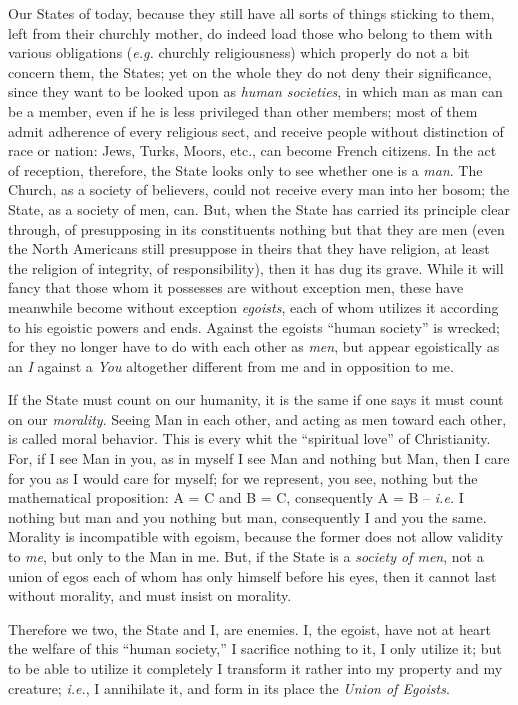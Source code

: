 Our States of today, because they still have all sorts of things sticking to 
them, left from their churchly mother, do indeed load those who belong to them 
with various obligations (\textit{e.g.} churchly religiousness) which 
properly do not a bit concern them, the States; yet on the whole they do not 
deny their significance, since they want to be looked upon as \textit{human 
societies}, in which man as man can be a member, even if he is less privileged 
than other members; most of them admit adherence of every religious sect, and 
receive people without distinction of race or nation: Jews, Turks, Moors, 
etc., can become French citizens. In the act of reception, therefore, the 
State looks only to see whether one is a \textit{man}. The Church, as a 
society of believers, could not receive every man into her bosom; the State, 
as a society of men, can. But, when the State has carried its principle clear 
through, of presupposing in its constituents nothing but that they are men 
(even the North Americans still presuppose in theirs that they have religion, 
at least the religion of integrity, of responsibility), then it has dug its 
grave. While it will fancy that those whom it possesses are without exception 
men, these have meanwhile become without exception \textit{egoists}, each of 
whom utilizes it according to his egoistic powers and ends. Against the 
egoists ``human society'' is wrecked; for they no longer have to do with 
each other as \textit{men}, but appear egoistically as an \textit{I} against a 
\textit{You} altogether different from me and in opposition to me.

If the State must count on our humanity, it is the same if one says it must 
count on our \textit{morality}. Seeing Man in each other, and acting as men 
toward each other, is called moral behavior. This is every whit the 
``spiritual love'' of Christianity. For, if I see Man in you, as in myself I 
see Man and nothing but Man, then I care for you as I would care for myself; 
for we represent, you see, nothing but the mathematical proposition: A = C and 
B = C, consequently A = B -- \textit{i.e.} I nothing but man and you nothing 
but man, consequently I and you the same. Morality is incompatible with 
egoism, because the former does not allow validity to \textit{me}, but only to 
the Man in me. But, if the State is a \textit{society of men}, not a union of 
egos each of whom has only himself before his eyes, then it cannot last 
without morality, and must insist on morality.

Therefore we two, the State and I, are enemies. I, the egoist, have not at 
heart the welfare of this ``human society,'' I sacrifice nothing to it, I 
only utilize it; but to be able to utilize it completely I transform it rather 
into my property and my creature; \textit{i.e.}, I annihilate it, and form in 
its place the \textit{Union of Egoists}.


